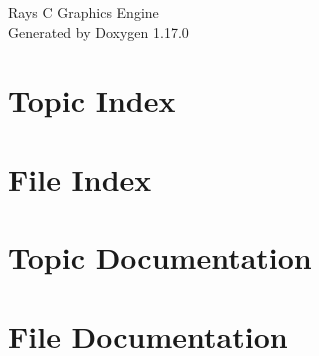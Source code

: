 \documentclass[twoside]{book}
\newcommand{\+}{\discretionary{\mbox{\scriptsize$\hookleftarrow$}}{}{}}
\newcommand{\clearemptydoublepage}{%
    \newpage{\pagestyle{empty}\cleardoublepage}%
  }
\begin{document}
  \raggedbottom
    \hypersetup{pageanchor=false,
                bookmarksnumbered=true,
                pdfencoding=unicode
               }
  \begin{titlepage}
  \vspace*{7cm}
  \begin{center}%
  {\Large Ray\textquotesingle{}s C Graphics Engine}\\
  \vspace*{1cm}
  {\large Generated by Doxygen 1.17.0}\\
  \end{center}
  \end{titlepage}
  \clearemptydoublepage
  \tableofcontents
  \clearemptydoublepage
  \hypersetup{pageanchor=true}


\chapter{Topic Index}

\chapter{File Index}

\chapter{Topic Documentation}










\chapter{File Documentation}























  \backmatter
  \newpage
  \clearemptydoublepage
  \printindex
\end{document}
